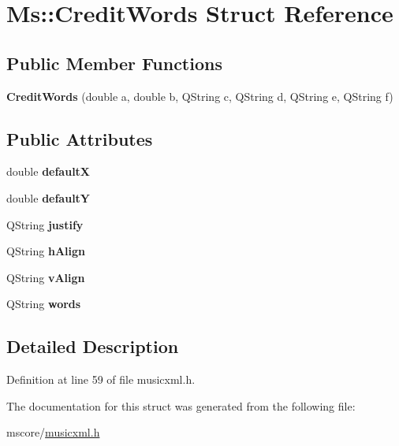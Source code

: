 \hypertarget{struct_ms_1_1_credit_words}{}\section{Ms\+:\+:Credit\+Words Struct Reference}
\label{struct_ms_1_1_credit_words}
\subsection*{Public Member Functions}
\begin{DoxyCompactItemize}
\item 
\mbox{\label{struct_ms_1_1_credit_words_a27803713710043264e6fdc9fd9c8042d}} 
{\bfseries Credit\+Words} (double a, double b, Q\+String c, Q\+String d, Q\+String e, Q\+String f)
\end{DoxyCompactItemize}
\subsection*{Public Attributes}
\begin{DoxyCompactItemize}
\item 
\mbox{\label{struct_ms_1_1_credit_words_a6ae82372b7d4d7d388e90002ea139be8}} 
double {\bfseries defaultX}
\item 
\mbox{\label{struct_ms_1_1_credit_words_ad45d9ed1a62940d5b1557dd4ace2c2ba}} 
double {\bfseries defaultY}
\item 
\mbox{\label{struct_ms_1_1_credit_words_a95586720d0bec746712daf24a5a2c7f2}} 
Q\+String {\bfseries justify}
\item 
\mbox{\label{struct_ms_1_1_credit_words_a4ebb2b004601981c3e242bee4c75c7c2}} 
Q\+String {\bfseries h\+Align}
\item 
\mbox{\label{struct_ms_1_1_credit_words_a0e151e67f5d755350b940332775af892}} 
Q\+String {\bfseries v\+Align}
\item 
\mbox{\label{struct_ms_1_1_credit_words_af23966602a255bed1860afc4fa06ae0f}} 
Q\+String {\bfseries words}
\end{DoxyCompactItemize}


\subsection{Detailed Description}


Definition at line 59 of file musicxml.\+h.



The documentation for this struct was generated from the following file\+:\begin{DoxyCompactItemize}
\item 
mscore/\hyperlink{musicxml_8h}{musicxml.\+h}\end{DoxyCompactItemize}
